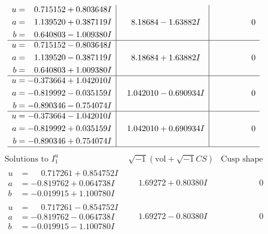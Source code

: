 \documentclass[1p]{elsarticle_modified}
\theoremstyle{definition}
\newcommand{\I}{\sqrt{-1}}
\begin{document}
$$\begin{array}{c|c|c}
\begin{aligned}
u &= \phantom{-}0.715152 + 0.803648 I \\
a &= \phantom{-}1.139520 + 0.387119 I \\
b &= \phantom{-}0.640803 - 1.009380 I\end{aligned}
 & \phantom{-}8.18684 - 1.63882 I & \phantom{-0.000000 } 0 \\ \hline\begin{aligned}
u &= \phantom{-}0.715152 - 0.803648 I \\
a &= \phantom{-}1.139520 - 0.387119 I \\
b &= \phantom{-}0.640803 + 1.009380 I\end{aligned}
 & \phantom{-}8.18684 + 1.63882 I & \phantom{-0.000000 } 0 \\ \hline\begin{aligned}
u &= -0.373664 + 1.042010 I \\
a &= -0.819992 - 0.035159 I \\
b &= -0.890346 - 0.754074 I\end{aligned}
 & \phantom{-}1.042010 - 0.690934 I & \phantom{-0.000000 } 0 \\ \hline\begin{aligned}
u &= -0.373664 - 1.042010 I \\
a &= -0.819992 + 0.035159 I \\
b &= -0.890346 + 0.754074 I\end{aligned}
 & \phantom{-}1.042010 + 0.690934 I & \phantom{-0.000000 } 0\\
 \hline 
 \end{array}$$\newpage$$\begin{array}{c|c|c}  
\text{Solutions to }I^u_{1}& \I (\text{vol} + \sqrt{-1}CS) & \text{Cusp shape}\\
 \hline 
\begin{aligned}
u &= \phantom{-}0.717261 + 0.854752 I \\
a &= -0.819762 + 0.064738 I \\
b &= -0.019915 + 1.100780 I\end{aligned}
 & \phantom{-}1.69272 + 0.80380 I & \phantom{-0.000000 } 0 \\ \hline\begin{aligned}
u &= \phantom{-}0.717261 - 0.854752 I \\
a &= -0.819762 - 0.064738 I \\
b &= -0.019915 - 1.100780 I\end{aligned}
 & \phantom{-}1.69272 - 0.80380 I & \phantom{-0.000000 } 0 \\ \hline\begin{aligned}

\end{aligned}
\end{array}$$
\end{document}
